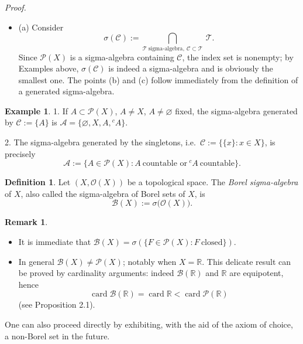 \documentclass[12pt]{article}
\theoremstyle{definition}
\newtheorem{definition}{Definition}[section]
\newtheorem{example}{Example}[section]
\newtheorem{remark}{Remark}[section]
\begin{document}
\noindent\textit{Proof.}
\begin{itemize}
\item (a) Consider
\[
\sigma(\mathscr C):=\bigcap_{\mathcal T\ \text{sigma-algebra},\ \mathscr C\subset\mathcal T}\ \mathcal T .
\]
Since $\mathcal P(X)$ is a sigma-algebra containing $\mathscr C$, the index set is nonempty; by Examples above, $\sigma(\mathscr C)$ is indeed a sigma-algebra and is obviously the smallest one.
The points (b) and (c) follow immediately from the definition of a generated sigma-algebra.
\end{itemize}

\begin{example}
1. If $A\subset\mathcal P(X)$, $A\ne X$, $A\ne\varnothing$ fixed, the sigma-algebra generated by $\mathscr C:=\{A\}$ is $\mathcal A=\{\varnothing,X,A,{}^{c}\!A\}$.

2. The sigma-algebra generated by the singletons, i.e.\ $\mathscr C:=\{\{x\}:x\in X\}$, is precisely
\[
\mathcal A:=\{A\in\mathcal P(X): A\ \text{countable or}\ {}^{c}\!A\ \text{countable}\}.
\]

\end{example}

\begin{definition}
Let $(X,\mathcal O(X))$ be a topological space. The \emph{Borel sigma-algebra} of $X$, also called the sigma-algebra of Borel sets of $X$, is
\[
\mathcal B(X):=\sigma\bigl(\mathcal O(X)\bigr).
\]
\end{definition}

\begin{remark}
\begin{itemize}[leftmargin=1.5em]
\item It is immediate that $\mathcal B(X)=\sigma(\{F\in\mathcal P(X): F\ \text{closed}\})$.
\item In general $\mathcal B(X)\ne\mathcal P(X)$; notably when $X=\mathbb R$. This delicate result can be proved by cardinality arguments: indeed $\mathcal B(\mathbb R)$ and $\mathbb R$ are equipotent, hence
\[
\operatorname{card}\mathcal B(\mathbb R)=\operatorname{card}\mathbb R<\operatorname{card}\mathcal P(\mathbb R)
\]
(see Proposition 2.1).
\end{itemize}

\end{remark}
One can also proceed directly by exhibiting, with the aid of the axiom of choice, a non-Borel set in the future.
\end{document}
